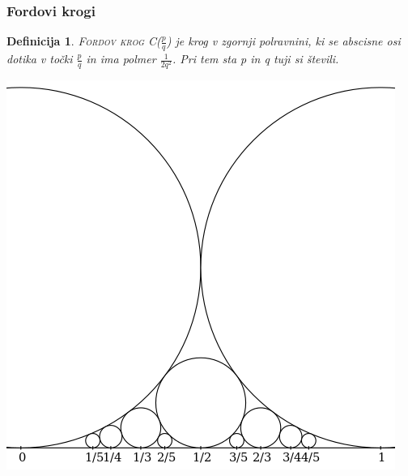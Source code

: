 \documentclass{beamer}
\newtheorem{definicija}{Definicija}
\newcommand{\pojem}[1]{\textsc{#1}}
\begin{document}
\begin{frame}
\frametitle{Fordovi krogi}

\begin{definicija}
\pojem{Fordov krog} C($\frac{p}{q}$) je krog v zgornji polravnini, ki se abscisne osi dotika v točki $\frac{p}{q}$ in ima polmer $\frac{1}{2q^2}$. Pri tem sta p in q tuji si števili. 
\end{definicija}

\begin{center}
\includegraphics[scale=0.3]{fordov-krog.png}
\end{center}

\end{frame}

\end{document}
